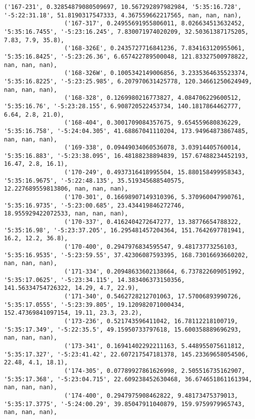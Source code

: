 \documentclass{article}
\begin{document}
\begin{Verbatim}[commandchars=\\\{\}]
                 ('167-231', 0.32854879080509697, 10.567292897982984, '5:35:16.728', '-5:22:31.18', 51.8190317547333, 4.367559662217565, nan, nan, nan),
                 ('167-317', 0.24955691955806011, 8.026634513632452, '5:35:16.7455', '-5:23:16.245', 7.830071974020209, 32.50361387175205, 7.83, 7.9, 35.8),
                 ('168-326E', 0.2435727716841236, 7.834163120955061, '5:35:16.8425', '-5:23:26.36', 6.657422789500048, 121.83327500978822, nan, nan, nan),
                 ('168-326W', 0.1005342149006856, 3.2335364635523374, '5:35:16.8225', '-5:23:25.985', 6.207970631425778, 120.34661250624949, nan, nan, nan),
                 ('168-328', 0.1269980216773827, 4.084706229600512, '5:35:16.76', '-5:23:28.155', 6.908720522453734, 140.1817864462777, 6.64, 2.8, 21.0),
                 ('168-404', 0.3001709084357675, 9.654559680836229, '5:35:16.758', '-5:24:04.305', 41.68867041110204, 173.94964873867485, nan, nan, nan),
                 ('169-338', 0.09449034060536078, 3.03914405760014, '5:35:16.883', '-5:23:38.095', 16.48188238894839, 157.67488234452193, 16.47, 2.8, 16.1),
                 ('170-249', 0.4937316418995504, 15.880158499958343, '5:35:16.9675', '-5:22:48.135', 35.519345688540575, 12.227689559813806, nan, nan, nan),
                 ('170-301', 0.16698907149310396, 5.370960047990761, '5:35:16.9735', '-5:23:00.685', 23.434419846272746, 18.955929422072533, nan, nan, nan),
                 ('170-337', 0.4162404272647277, 13.38776654788322, '5:35:16.98', '-5:23:37.205', 16.295481457204364, 151.7642697781941, 16.2, 12.2, 36.8),
                 ('170-400', 0.2947976834595547, 9.48173773256103, '5:35:16.9535', '-5:23:59.55', 37.42306087593395, 168.73016693660202, nan, nan, nan),
                 ('171-334', 0.20948633602138664, 6.737822609051992, '5:35:17.0625', '-5:23:34.115', 14.383406373150356, 141.56334754726322, 14.29, 4.7, 22.9),
                 ('171-340', 0.5462728212701063, 17.57006893990726, '5:35:17.0555', '-5:23:39.805', 19.120982071000434, 152.47369841097154, 19.11, 23.3, 23.2),
                 ('173-236', 0.521743596411042, 16.78112218100719, '5:35:17.349', '-5:22:35.5', 49.15950733797618, 15.600358889696293, nan, nan, nan),
                 ('173-341', 0.16941402292211163, 5.448955075611812, '5:35:17.327', '-5:23:41.42', 22.607217547181378, 145.23369658054506, 22.48, 4.1, 18.1),
                 ('174-305', 0.07789927861626998, 2.505516735162907, '5:35:17.368', '-5:23:04.715', 22.609238452630468, 36.674651861161394, nan, nan, nan),
                 ('174-400', 0.2947975908462822, 9.48173475379013, '5:35:17.3775', '-5:24:00.29', 39.85047911040879, 159.9759979965743, nan, nan, nan),

\end{Verbatim}
\end{document}
